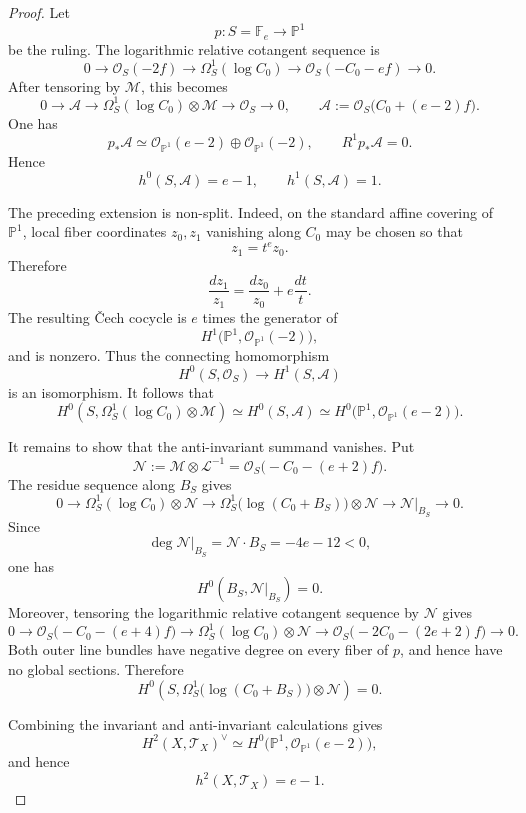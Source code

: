 \documentclass[11pt,twoside]{amsart}
\theoremstyle{plain}
\numberwithin{equation}{section}
\theoremstyle{definition}
\begin{document}
\begin{proof}
Let
\[
p:S=\mathbb F_e\longrightarrow\mathbb P^1
\]
be the ruling. The logarithmic relative cotangent sequence is
\[
0
\longrightarrow
\mathcal O_S(-2f)
\longrightarrow
\Omega_S^1(\log C_0)
\longrightarrow
\mathcal O_S(-C_0-ef)
\longrightarrow
0.
\]
After tensoring by $\mathcal M$, this becomes
\[
0
\longrightarrow
\mathcal A
\longrightarrow
\Omega_S^1(\log C_0)\otimes\mathcal M
\longrightarrow
\mathcal O_S
\longrightarrow
0,
\qquad
\mathcal A:=\mathcal O_S\bigl(C_0+(e-2)f\bigr).
\]
One has
\[
p_*\mathcal A
\simeq
\mathcal O_{\mathbb P^1}(e-2)
\oplus
\mathcal O_{\mathbb P^1}(-2),
\qquad
R^1p_*\mathcal A=0.
\]
Hence
\[
h^0(S,\mathcal A)=e-1,
\qquad
h^1(S,\mathcal A)=1.
\]

The preceding extension is non-split. Indeed, on the standard affine covering of
$\mathbb P^1$, local fiber coordinates $z_0,z_1$ vanishing along $C_0$ may be chosen so
that
\[
z_1=t^ez_0.
\]
Therefore
\[
\frac{dz_1}{z_1}
=
\frac{dz_0}{z_0}
+
e\frac{dt}{t}.
\]
The resulting Čech cocycle is $e$ times the generator of
\[
H^1\bigl(\mathbb P^1,\mathcal O_{\mathbb P^1}(-2)\bigr),
\]
and is nonzero. Thus the connecting homomorphism
\[
H^0(S,\mathcal O_S)
\longrightarrow
H^1(S,\mathcal A)
\]
is an isomorphism. It follows that
\[
H^0\left(
S,\Omega_S^1(\log C_0)\otimes\mathcal M
\right)
\simeq
H^0(S,\mathcal A)
\simeq
H^0\bigl(\mathbb P^1,\mathcal O_{\mathbb P^1}(e-2)\bigr).
\]

It remains to show that the anti-invariant summand vanishes. Put
\[
\mathcal N
:=
\mathcal M\otimes\mathcal L^{-1}
=
\mathcal O_S\bigl(-C_0-(e+2)f\bigr).
\]
The residue sequence along $B_S$ gives
\[
0
\longrightarrow
\Omega_S^1(\log C_0)\otimes\mathcal N
\longrightarrow
\Omega_S^1\bigl(\log(C_0+B_S)\bigr)\otimes\mathcal N
\longrightarrow
\mathcal N|_{B_S}
\longrightarrow
0.
\]
Since
\[
\deg\mathcal N|_{B_S}
=
\mathcal N\cdot B_S
=
-4e-12<0,
\]
one has
\[
H^0(B_S,\mathcal N|_{B_S})=0.
\]
Moreover, tensoring the logarithmic relative cotangent sequence by $\mathcal N$
gives
\[
0
\longrightarrow
\mathcal O_S\bigl(-C_0-(e+4)f\bigr)
\longrightarrow
\Omega_S^1(\log C_0)\otimes\mathcal N
\longrightarrow
\mathcal O_S\bigl(-2C_0-(2e+2)f\bigr)
\longrightarrow
0.
\]
Both outer line bundles have negative degree on every fiber of $p$, and hence have
no global sections. Therefore
\[
H^0\left(
S,
\Omega_S^1\bigl(\log(C_0+B_S)\bigr)\otimes\mathcal N
\right)
=0.
\]

Combining the invariant and anti-invariant calculations gives
\[
H^2(X,\mathcal T_X)^\vee
\simeq
H^0\bigl(\mathbb P^1,\mathcal O_{\mathbb P^1}(e-2)\bigr),
\]
and hence
\[
h^2(X,\mathcal T_X)=e-1.
\]
\end{proof}
\end{document}
